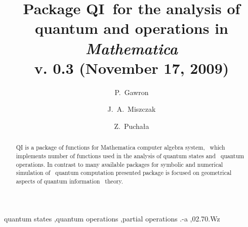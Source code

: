 \documentclass[final,3p,times]{elsarticle}
\newcommand{\Mathematica}{\emph{Mathematica}}
\newcommand{\1}{{\rm 1\hspace{-0.9mm}l}}
\newcommand{\qi}{QI}
\begin{document}
\begin{frontmatter}



\title{Package \qi\ for the analysis of quantum and operations in \Mathematica\\[6pt] \small{v. 0.3 (November 17, 2009)}}


\author{P.~Gawron}
\author{J.~A.~Miszczak}
\author{Z.~Pucha{\l}a}
\address{Institute of Theoretical and Applied Informatics, Polish Academy of 
Sciences, Ba{\l}tycka 5, 44-100 Gliwice, Poland}

\begin{abstract}
QI is a package of functions for Mathematica computer algebra system, \ which
implements number of functions used in the analysis of quantum states and \
quantum operations. In contrast to many available packages for symbolic and
numerical simulation of \ quantum computation presented package is focused on
geometrical aspects of quantum information \ theory.

\end{abstract}

\begin{keyword}
quantum states \sep quantum operations \sep partial operations
.-a \sep 02.70.Wz


\end{keyword}

\end{frontmatter}
\end{document}
